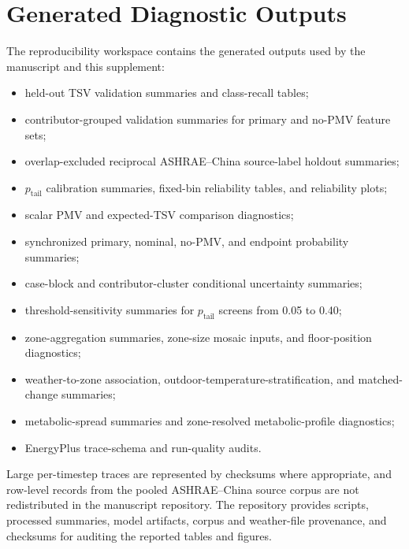 \documentclass[11pt]{article}
\begin{document}
\section{Generated Diagnostic Outputs}

The reproducibility workspace contains the generated outputs used by the manuscript and this supplement:
\begin{itemize}
    \item held-out TSV validation summaries and class-recall tables;
    \item contributor-grouped validation summaries for primary and no-PMV feature sets;
    \item overlap-excluded reciprocal ASHRAE--China source-label holdout summaries;
    \item $p_{\mathrm{tail}}$ calibration summaries, fixed-bin reliability tables, and reliability plots;
    \item scalar PMV and expected-TSV comparison diagnostics;
    \item synchronized primary, nominal, no-PMV, and endpoint probability summaries;
    \item case-block and contributor-cluster conditional uncertainty summaries;
    \item threshold-sensitivity summaries for $p_{\mathrm{tail}}$ screens from 0.05 to 0.40;
    \item zone-aggregation summaries, zone-size mosaic inputs, and floor-position diagnostics;
    \item weather-to-zone association, outdoor-temperature-stratification, and matched-change summaries;
    \item metabolic-spread summaries and zone-resolved metabolic-profile diagnostics;
    \item EnergyPlus trace-schema and run-quality audits.
\end{itemize}

Large per-timestep traces are represented by checksums where appropriate, and row-level records from the pooled ASHRAE--China source corpus are not redistributed in the manuscript repository. The repository provides scripts, processed summaries, model artifacts, corpus and weather-file provenance, and checksums for auditing the reported tables and figures.



\end{document}
